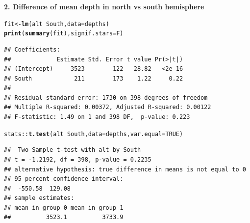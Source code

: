 \documentclass[10pt]{beamer}\usepackage[]{graphicx}\usepackage[]{color}
\makeatletter
\newcommand{\hlnum}[1]{\textcolor[rgb]{0.686,0.059,0.569}{#1}}%
\newcommand{\hlopt}[1]{\textcolor[rgb]{0,0,0}{#1}}%
\newcommand{\hlstd}[1]{\textcolor[rgb]{0.345,0.345,0.345}{#1}}%
\newcommand{\hlkwb}[1]{\textcolor[rgb]{0.69,0.353,0.396}{#1}}%
\newcommand{\hlkwc}[1]{\textcolor[rgb]{0.333,0.667,0.333}{#1}}%
\newcommand{\hlkwd}[1]{\textcolor[rgb]{0.737,0.353,0.396}{\textbf{#1}}}%
\newenvironment{kframe}{%
 \def\at@end@of@kframe{}%
 \ifinner\ifhmode%
  \def\at@end@of@kframe{\end{minipage}}%
  \begin{minipage}{\columnwidth}%
 \fi\fi%
 \def\FrameCommand##1{\hskip\@totalleftmargin \hskip-\fboxsep
 \colorbox{shadecolor}{##1}\hskip-\fboxsep
     \hskip-\linewidth \hskip-\@totalleftmargin \hskip\columnwidth}%
 \MakeFramed {\advance\hsize-\width
   \@totalleftmargin\z@ \linewidth\hsize
   \@setminipage}}%
 {\par\unskip\endMakeFramed%
 \at@end@of@kframe}
\newenvironment{knitrout}{}{} %
\makeatother
\begin{document}
\begin{frame}
\vspace*{-.90551in}
\textbf{2. Difference of mean depth in north vs south hemisphere}

	
	
\begin{knitrout}\tiny
{}\color{fgcolor}\begin{kframe}
\begin{alltt}
\hlstd{fit} \hlkwb{<-} \hlkwd{lm}\hlstd{(alt} \hlopt{~} \hlstd{South,} \hlkwc{data} \hlstd{= depths)}
\hlkwd{print}\hlstd{(}\hlkwd{summary}\hlstd{(fit),} \hlkwc{signif.stars} \hlstd{= F)}
\end{alltt}
\begin{verbatim}
## Coefficients:
##             Estimate Std. Error t value Pr(>|t|)
## (Intercept)     3523        122   28.82   <2e-16
## South            211        173    1.22     0.22
## 
## Residual standard error: 1730 on 398 degrees of freedom
## Multiple R-squared: 0.00372,	Adjusted R-squared: 0.00122 
## F-statistic: 1.49 on 1 and 398 DF,  p-value: 0.223
\end{verbatim}
\begin{alltt}
\hlstd{stats}\hlopt{::}\hlkwd{t.test}\hlstd{(alt} \hlopt{~} \hlstd{South,} \hlkwc{data} \hlstd{= depths,} \hlkwc{var.equal} \hlstd{=} \hlnum{TRUE}\hlstd{)}
\end{alltt}
\begin{verbatim}
##  Two Sample t-test with alt by South 
## t = -1.2192, df = 398, p-value = 0.2235
## alternative hypothesis: true difference in means is not equal to 0 
## 95 percent confidence interval:
##  -550.58  129.08 
## sample estimates:
## mean in group 0 mean in group 1 
##          3523.1          3733.9
\end{verbatim}
\end{kframe}
\end{knitrout}
\end{frame}
\end{document}
